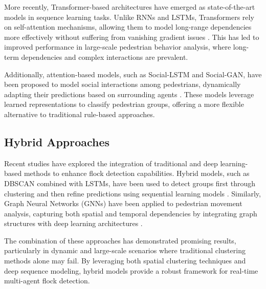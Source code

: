 More recently, Transformer-based architectures have emerged as state-of-the-art models in sequence learning tasks. Unlike RNNs and LSTMs, Transformers rely on self-attention mechanisms, allowing them to model long-range dependencies more effectively without suffering from vanishing gradient issues \cite{vaswani2017attention}. This has led to improved performance in large-scale pedestrian behavior analysis, where long-term dependencies and complex interactions are prevalent.

Additionally, attention-based models, such as Social-LSTM and Social-GAN, have been proposed to model social interactions among pedestrians, dynamically adapting their predictions based on surrounding agents \cite{gupta2018social}. These models leverage learned representations to classify pedestrian groups, offering a more flexible alternative to traditional rule-based approaches.

\subsection{Hybrid Approaches}

Recent studies have explored the integration of traditional and deep learning-based methods to enhance flock detection capabilities. Hybrid models, such as DBSCAN combined with LSTMs, have been used to detect groups first through clustering and then refine predictions using sequential learning models \cite{jia2020trajectory}. Similarly, Graph Neural Networks (GNNs) have been applied to pedestrian movement analysis, capturing both spatial and temporal dependencies by integrating graph structures with deep learning architectures \cite{zhang2020graph}.

The combination of these approaches has demonstrated promising results, particularly in dynamic and large-scale scenarios where traditional clustering methods alone may fail. By leveraging both spatial clustering techniques and deep sequence modeling, hybrid models provide a robust framework for real-time multi-agent flock detection.